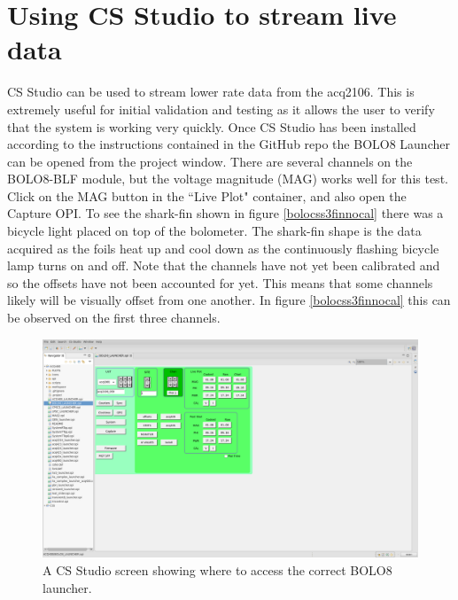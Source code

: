 \documentclass{article}
\begin{document}
\newpage

\section{Using CS Studio to stream live data}
CS Studio can be used to stream lower rate data from the acq2106.
This is extremely useful for initial validation and testing as it allows the user to verify that the system is working very quickly.
Once CS Studio has been installed according to the instructions contained in the GitHub repo the BOLO8 Launcher can be opened from the project window.
There are several channels on the BOLO8-BLF module, but the voltage magnitude (MAG) works well for this test.
Click on the MAG button in the ``Live Plot" container, and also open the Capture OPI.
To see the shark-fin shown in figure \ref{bolocss3finnocal} there was a bicycle light placed on top of the bolometer.
The shark-fin shape is the data acquired as the foils heat up and cool down as the continuously flashing bicycle lamp turns on and off.
Note that the channels have not yet been calibrated and so the offsets have not been accounted for yet.
This means that some channels likely will be visually offset from one another.
In figure \ref{bolocss3finnocal} this can be observed on the first three channels.

\begin{figure}
	\centering
	\includegraphics[width=5.0in]{images/css_launcher.png}
	\caption{A CS Studio screen showing where to access the correct BOLO8 launcher.}
	\label{bolocsslauncher}
\end{figure}
\end{document}
